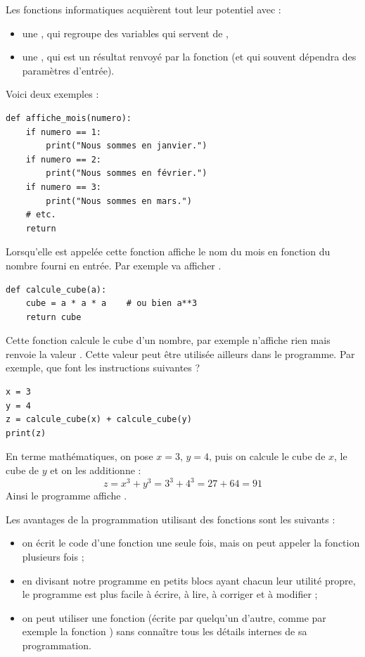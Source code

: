 \documentclass[11pt,class=report,crop=false]{standalone}
\begin{document}
\begin{cours}

Les fonctions informatiques acquièrent tout leur potentiel avec :
\begin{itemize}
  \item une , qui regroupe des variables qui servent de ,
  \item une , qui est un résultat renvoyé par la fonction (et qui souvent dépendra des paramètres d'entrée).
\end{itemize}

Voici deux exemples :
\begin{center}
\begin{lstlisting}
def affiche_mois(numero):
    if numero == 1:
        print("Nous sommes en janvier.")
    if numero == 2:
        print("Nous sommes en février.")
    if numero == 3:
        print("Nous sommes en mars.")
    # etc.
    return
\end{lstlisting}
\end{center}
Lorsqu'elle est appelée cette fonction affiche le nom du mois en fonction du nombre fourni en entrée. Par exemple  va afficher .

\begin{center}
\begin{lstlisting}
def calcule_cube(a):
    cube = a * a * a    # ou bien a**3
    return cube
\end{lstlisting}

\end{center}

Cette fonction calcule le cube d'un nombre, par exemple  n'affiche rien mais renvoie la valeur . Cette valeur peut être utilisée ailleurs dans le programme.
Par exemple, que font les instructions suivantes ?
\begin{center}
\begin{lstlisting}
x = 3
y = 4
z = calcule_cube(x) + calcule_cube(y)
print(z)
\end{lstlisting}
\end{center}
En terme mathématiques, on pose $x=3$, $y=4$, puis on calcule le cube de $x$, le cube de $y$ et on les additionne :
$$z = x^3 + y^3 = 3^3 + 4^3 = 27 + 64 = 91$$
Ainsi le programme affiche .

Les avantages de la programmation utilisant des fonctions sont les suivants :
\begin{itemize}
  \item on écrit le code d'une fonction une seule fois, mais on peut appeler la fonction plusieurs fois ;
  \item en divisant notre programme en petits blocs ayant chacun leur utilité propre, le programme est plus facile à écrire, à lire, à corriger et à modifier ;
  \item on peut utiliser une fonction (écrite par quelqu'un d'autre, comme par exemple la fonction ) sans connaître tous les détails internes de sa programmation.
\end{itemize} 


\end{cours}
\end{document}
